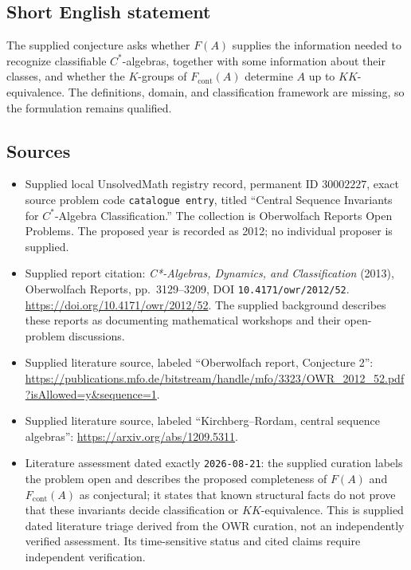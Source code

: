 \documentclass[11pt]{article}
\begin{document}
\subsection{Short English statement}
The supplied conjecture asks whether \(F(A)\) supplies the information needed to recognize classifiable \(C^*\)-algebras, together with some information about their classes, and whether the \(K\)-groups of \(F_{\mathrm{cont}}(A)\) determine \(A\) up to \(KK\)-equivalence. The definitions, domain, and classification framework are missing, so the formulation remains qualified.
\subsection{Sources}
\begin{itemize}
\item Supplied local UnsolvedMath registry record, permanent ID \(30002227\), exact source problem code \texttt{catalogue entry}, titled ``Central Sequence Invariants for \(C^*\)-Algebra Classification.'' The collection is Oberwolfach Reports Open Problems. The proposed year is recorded as 2012; no individual proposer is supplied.
\item Supplied report citation: \emph{C*-Algebras, Dynamics, and Classification} (2013), Oberwolfach Reports, pp.\ 3129--3209, DOI \texttt{10.4171/owr/2012/52}. \url{https://doi.org/10.4171/owr/2012/52}. The supplied background describes these reports as documenting mathematical workshops and their open-problem discussions.
\item Supplied literature source, labeled ``Oberwolfach report, Conjecture 2'': \url{https://publications.mfo.de/bitstream/handle/mfo/3323/OWR_2012_52.pdf?isAllowed=y&sequence=1}.
\item Supplied literature source, labeled ``Kirchberg--Rordam, central sequence algebras'': \url{https://arxiv.org/abs/1209.5311}.
\item Literature assessment dated exactly \texttt{2026-08-21}: the supplied curation labels the problem open and describes the proposed completeness of \(F(A)\) and \(F_{\mathrm{cont}}(A)\) as conjectural; it states that known structural facts do not prove that these invariants decide classification or \(KK\)-equivalence. This is supplied dated literature triage derived from the OWR curation, not an independently verified assessment. Its time-sensitive status and cited claims require independent verification.
\end{itemize}
\end{document}
